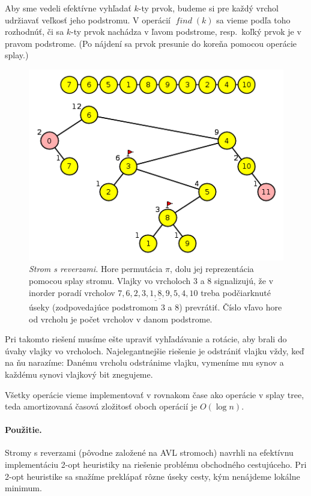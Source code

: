 Aby sme vedeli efektívne vyhľadať $k$-ty prvok, budeme si pre každý vrchol udržiavať veľkosť jeho
podstromu. V operácií $\mathop{\mathit{find}}(k)$ sa vieme podľa toho rozhodnúť, či sa $k$-ty prvok nachádza v ľavom podstrome,
resp.~koľký prvok je v pravom podstrome. (Po nájdení sa prvok presunie do koreňa pomocou operácie splay.)

\begin{figure}
\includegraphics[width=\columnwidth]{obrazky/rev1.png}
\caption{\emph{Strom s reverzami.} Hore permutácia $\pi$, dolu jej reprezentácia pomocou splay stromu.
Vlajky vo vrcholoch 3 a 8 signalizujú, že v inorder poradí vrcholov $7,6,\underline{2,3,\underline{1,8,9},5},4,10$
treba podčiarknuté úseky (zodpovedajúce podstromom 3 a 8) prevrátiť.
Číslo vľavo hore od vrcholu je počet vrcholov v danom podstrome.}
\label{img:rev1}
\end{figure}

Pri takomto riešení musíme ešte upraviť vyhľadávanie a rotácie, aby brali do úvahy vlajky vo vrcholoch.
Najelegantnejšie riešenie je odstrániť vlajku vždy, keď na ňu narazíme:
Danému vrcholu odstránime vlajku, vymeníme mu synov a každému synovi vlajkový bit znegujeme.

Všetky operácie vieme implementovať v rovnakom čase ako operácie v splay tree, teda amortizovaná 
časová zložitosť oboch operácií je $O(\log n)$.

\paragraph{Použitie.}
Stromy s reverzami (pôvodne založené na AVL stromoch) navrhli \citet{chrobak}
na efektívnu implementáciu 2-opt heuristiky na riešenie problému obchodného cestujúceho.
Pri 2-opt heuristike sa snažíme preklápať rôzne úseky cesty, kým nenájdeme lokálne minimum.

